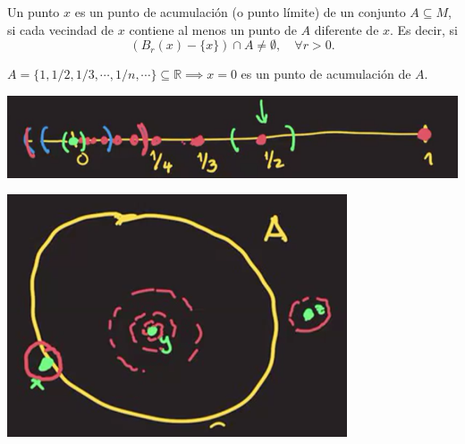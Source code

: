 \begin{definicion}
	Un punto $x$ es un punto de acumulación (o punto límite) de un conjunto $A\subseteq M$, si cada vecindad de $x$ contiene al menos un punto de $A$ diferente de $x$. Es decir, si 
	$$(B_r(x)-\{x\})\cap A\neq \emptyset, \quad \forall r>0.$$
\end{definicion}

\begin{ejemplo}
	$A=\{1,1/2,1/3,\cdots, 1/n, \cdots \}\subseteq \mathbb{R}\implies x=0$ es un punto de acumulación de $A$. 
	\begin{center}
		\includegraphics[scale=0.4]{images/2/10}
	\end{center}
\end{ejemplo}
	\begin{center}
	\includegraphics[scale=0.4]{images/2/11}
\end{center}

